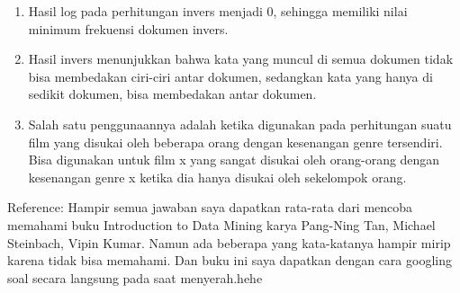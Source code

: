 \documentclass{article}
\begin{document}
\begin{enumerate}
\begin{enumerate}
		\item Hasil log pada perhitungan invers menjadi 0, sehingga memiliki nilai minimum frekuensi dokumen invers.
		\item Hasil invers menunjukkan bahwa kata yang muncul di semua dokumen tidak bisa membedakan ciri-ciri antar dokumen, sedangkan kata yang hanya di sedikit dokumen, bisa membedakan antar dokumen.
		\item Salah satu penggunaannya adalah ketika digunakan pada perhitungan suatu film yang disukai oleh beberapa orang dengan kesenangan genre tersendiri. Bisa digunakan untuk film x yang sangat disukai oleh orang-orang dengan kesenangan genre x ketika  dia hanya disukai oleh sekelompok orang.
	\end{enumerate}
\end{enumerate}
Reference: Hampir semua jawaban saya dapatkan rata-rata dari mencoba memahami buku Introduction to Data Mining karya Pang-Ning Tan, Michael Steinbach, Vipin Kumar. Namun ada beberapa yang kata-katanya hampir mirip karena tidak bisa memahami. Dan buku ini saya dapatkan dengan cara googling soal secara langsung pada saat menyerah.hehe
\end{document}
